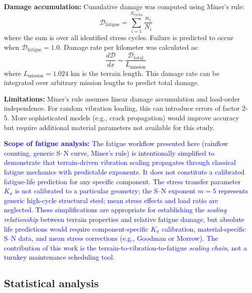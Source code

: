 \documentclass[11pt]{article}
\begin{document}
\textbf{Damage accumulation:} Cumulative damage was computed using Miner's rule:
\begin{equation}
\mathcal{D}_{\text{fatigue}} = \sum_{i=1}^{N_{\text{cycles}}} \frac{n_i}{N_i}
\end{equation}
where the sum is over all identified stress cycles. Failure is predicted to occur when $\mathcal{D}_{\text{fatigue}} = 1.0$. Damage rate per kilometer was calculated as:
\begin{equation}
\frac{d\mathcal{D}}{dx} = \frac{\mathcal{D}_{\text{total}}}{L_{\text{mission}}}
\end{equation}
where $L_{\text{mission}} = 1.024$ km is the terrain length. This damage rate can be integrated over arbitrary mission lengths to predict total damage.

\textbf{Limitations:} Miner's rule assumes linear damage accumulation and load-order independence. For random vibration loading, this can introduce errors of factor 2-5. More sophisticated models (e.g., crack propagation) would improve accuracy but require additional material parameters not available for this study.

\textcolor{blue}{\textbf{Scope of fatigue analysis:} The fatigue workflow presented here (rainflow counting, generic S--N curve, Miner's rule) is intentionally simplified to demonstrate that terrain-driven vibration scaling propagates through classical fatigue mechanics with predictable exponents. It does not constitute a calibrated fatigue-life prediction for any specific component. The stress transfer parameter $K_\sigma$ is not calibrated to a particular geometry; the S--N exponent $m = 5$ represents generic high-cycle structural steel; mean stress effects and load ratio are neglected. These simplifications are appropriate for establishing the \emph{scaling relationship} between terrain properties and relative fatigue damage, but absolute life predictions would require component-specific $K_\sigma$ calibration, material-specific S--N data, and mean stress corrections (e.g., Goodman or Morrow). The contribution of this work is the terrain-to-vibration-to-fatigue \emph{scaling chain}, not a turnkey maintenance scheduling tool.}

\subsection*{Statistical analysis}
\end{document}
